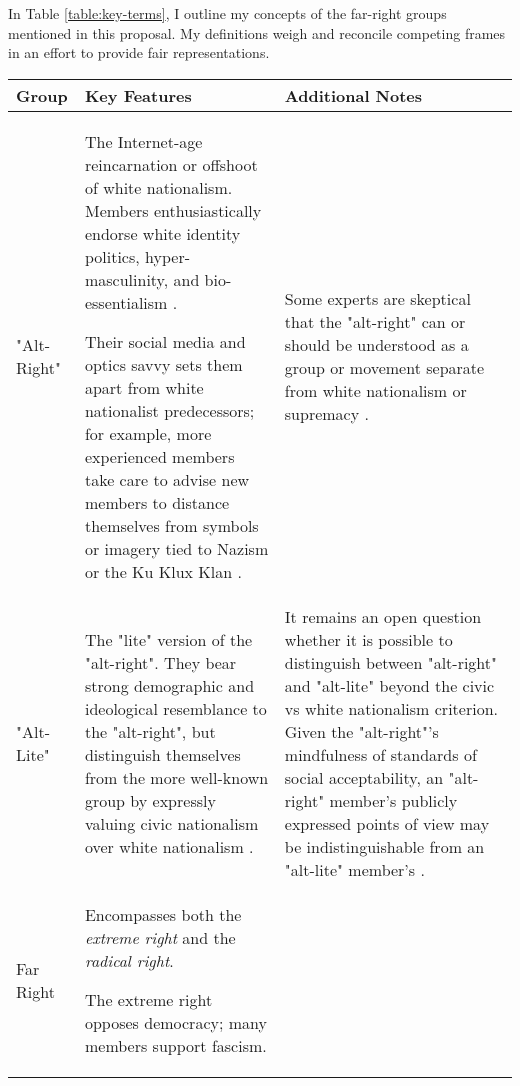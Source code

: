 \documentclass[acmlarge, screen, authorversion]{acmart}
\begin{document}
In Table \ref{table:key-terms}, I outline my concepts of the far-right groups mentioned in this proposal. My definitions weigh and reconcile competing frames in an effort to provide fair representations.

\begin{table*}
\caption{Key Far-Right Groups}
\label{table:key-terms}
\begin{tabular}{ p{3cm}  p{7cm}  p{6cm} }

  \toprule
  Group & Key Features & Additional Notes \\
  \midrule
  "Alt-Right" & The Internet-age reincarnation or offshoot of white nationalism. Members enthusiastically endorse white identity politics, hyper-masculinity, and bio-essentialism \cite{sternProudBoysWhite2019}.
  
  \medskip
  
  Their social media and optics savvy sets them apart from white nationalist predecessors; for example, more experienced members take care to advise new members to distance themselves from symbols or imagery tied to Nazism or the Ku Klux Klan \cite{sternProudBoysWhite2019, hawleyMakingSenseAltright2017}.

   & Some experts are skeptical that the "alt-right" can or should be understood as a group or movement separate from white nationalism or supremacy \cite{hartzellAltWhiteConceptualizingAltRight, johndaniszewskiWritingAltright2016}. \\ 
  \hline
  "Alt-Lite" & The "lite" version of the "alt-right". They bear strong demographic and ideological resemblance to the "alt-right", but distinguish themselves from the more well-known group by expressly valuing civic nationalism over white nationalism \cite{mainRiseAltRight2018,hawleyAltRightWhatEveryone2018,lyonsInsurgentSupremacistsFar2018}. & It remains an open question whether it is possible to distinguish between "alt-right" and "alt-lite" beyond the civic vs white nationalism criterion. Given the "alt-right"'s mindfulness of standards of social acceptability, an "alt-right" member's publicly expressed points of view may be indistinguishable from an "alt-lite" member's \cite{hartzellAltWhiteConceptualizingAltRight}. 
  \\
  \hline
  Far Right & Encompasses both the \textit{extreme right} and the \textit{radical right}. 
  
  \medskip
  
  The extreme right opposes democracy; many members support fascism. 
  

\end{tabular}
\end{table*}
\end{document}

